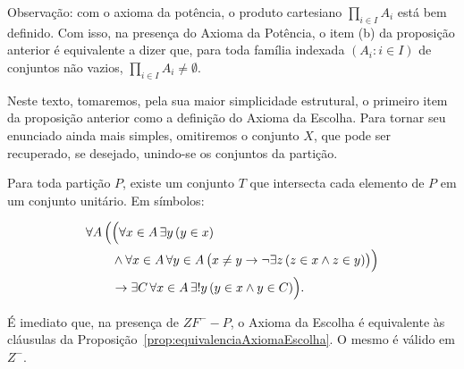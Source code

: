 Observação: com o axioma da potência, o produto cartesiano $\prod_{i\in I} A_i$ está bem definido.
Com isso, na presença do Axioma da Potência, o item (b) da proposição anterior é equivalente a dizer que, para toda família indexada $(A_i: i\in I)$ de conjuntos não vazios, $\prod_{i\in I} A_i \neq \emptyset$.

Neste texto, tomaremos, pela sua maior simplicidade estrutural, o primeiro item da proposição anterior como a definição do Axioma da Escolha.
Para tornar seu enunciado ainda mais simples, omitiremos o conjunto $X$, que pode ser recuperado, se desejado, unindo-se os conjuntos da partição.
\begin{axiom}\label{ax:escolhaParticao}
    Para toda partição $P$, existe um conjunto $T$ que intersecta cada elemento de $P$ em um conjunto unitário.
    Em símbolos:

    \[
        \begin{aligned}
            \forall A\, \Bigl(
                &\Bigl(
                    \forall x \in A\, \exists y\, (y \in x) \\
                    &\land \forall x \in A\, \forall y \in A\, \bigl(x \neq y \rightarrow \neg \exists z\, (z \in x \land z \in y)\bigr)
                \Bigr) \\
                &\rightarrow \exists C\, \forall x \in A\, \exists! y\, (y \in x \land y \in C)
            \Bigr).
        \end{aligned}
    \]
\end{axiom}

É imediato que, na presença de $ZF^--P$, o Axioma da Escolha é equivalente às cláusulas da Proposição~\ref{prop:equivalenciaAxiomaEscolha}.
O mesmo é válido em $Z^-$.
